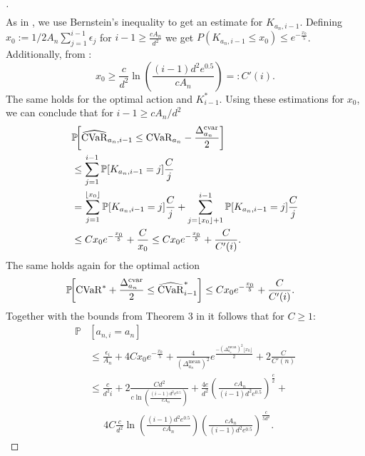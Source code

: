 \begin{proof}[\unskip\nopunct]
{\begin{align}
\end{align}}
As in \cite{Auer2002}, we use Bernstein's inequality to get an estimate for $K_{a_n,i-1}$. Defining $x_0 := {1}/{2A_n}\sum_{j=1}^{i-1}\epsilon_j$ for $i-1 \geq \frac{cA_n}{d^2}$ we get $P(K_{a_n,i-1} \leq x_0) \leq e^{-\frac{x_0}{5}}$.
Additionally, from \cite{Auer2002}: 
{\small
\begin{equation}
    x_0 \geq \frac{c}{d^2}\ln\left(\frac{(i-1)d^2e^{0.5}}{cA_n}\right) =: C'(i).
\end{equation}}
The same holds for the optimal action and $K^*_{i-1}$. Using these estimations for $x_0$, we can conclude that for $i-1 \geq {cA_n}/{d^2}$
{\small
\begin{align}
    &\mathbb{P}\!\left[\estcvar{a_n,i-1} \leq \cvar{a_n} - \frac{\Delta^\mathrm{cvar}_{a_n}}{2}\right] \\
    &\leq \sum_{j=1}^{i-1} \mathbb{P}[K_{a_n,i-1}=j] \frac{C}{j} \nonumber \\
    &= \sum_{j=1}^{\lfloor x_0 \rfloor} \mathbb{P}[K_{a_n,i-1}=j] \frac{C}{j} + \sum_{j=\lfloor x_0 \rfloor + 1}^{i-1} \mathbb{P}[K_{a_n,i-1}=j] \frac{C}{j} \nonumber\\
    &\leq C x_0 e^{-\frac{x_0}{5}} + \frac{C}{x_0} \leq C x_0 e^{-\frac{x_0}{5}} + \frac{C}{C'(i)}.
\end{align}
}
The same holds again for the optimal action
{\small
\begin{align}
    \mathbb{P}\!\left[\cvar{}^* + \frac{\Delta^\mathrm{cvar}_{a_n}}{2} \leq \estcvar{i-1}^*\right] &\leq C x_0 e^{-\frac{x_0}{5}} + \frac{C}{C'(i)}.
\end{align}}
Together with the bounds from Theorem 3 in \cite{Auer2002} it follows that for $C \geq 1$:
{\small
\begin{align*}
    \mathbb{P}&\left[a_{n,i} = a_n\right] \\
    &\leq \frac{\epsilon_i}{A_n} + 4 C x_0 e^{-\frac{x_0}{5}} + \frac{4}{\left(\Delta^\mathrm{mean}_{a_n}\right)^2}e^{\frac{-\left(\Delta^\mathrm{mean}_{a_n}\right)^2\lfloor x_0 \rfloor}{2}}  + 2 \frac{C}{C'(n)} \nonumber \\
    &\leq \frac{c}{d^2i} +  2 \frac{Cd^2}{c\ln\left(\frac{(i-1)d^2e^{0.5}}{cA_n}\right)}
    + \frac{4e}{d^2}\left(\frac{c A_n}{(i-1)d^2e^{0.5}}\right)^{\frac{c}{2}} +\\
    & \:\:\quad 4C\frac{c}{d^2}\ln\left(\frac{(i-1)d^2e^{0.5}}{c A_n}\right) \left(\frac{c A_n}{(i-1)d^2e^{0.5}}\right)^{\frac{c}{5d^2}}.
\end{align*}
}
\end{proof}